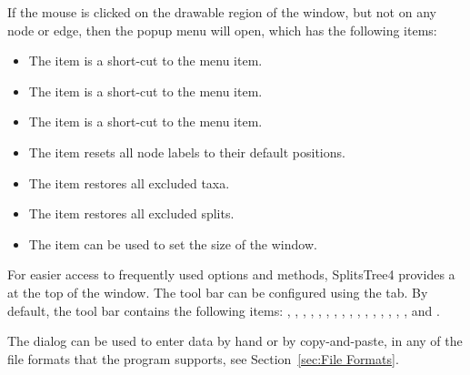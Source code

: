 \documentclass[11pt]{article}
\def\SplitsTree{{\sf SplitsTree4 }}
\begin{document}
If the mouse is clicked on the drawable region of the window, but not on any
node or edge, then
the  popup menu will open, which has the following items:
\begin{itemize}
\item The
 item is a short-cut to the
 menu item.
\item The
 item is a short-cut to the
 menu item.
\item The
 item is a short-cut to the
 menu item.
\item The
 item resets all node labels
to their default positions.
\item The
 item restores all excluded taxa.
\item The
 item restores all excluded
splits.
\item The
 item can be used to
set the size of the  window.
\end{itemize}



For easier access to frequently used options and methods, \SplitsTree
provides a  at the top of the  window.
The tool bar can be configured using the 
tab.
By default, the tool bar contains the following
items:
,
,
,
,
,
,
,
,
,
,
,
,
,
,
,
,
 and
.


The  dialog can be used to enter data  by hand or by copy-and-paste, in any of the
file formats that the program supports, see Section~\ref{sec:File Formats}.
\end{document}
